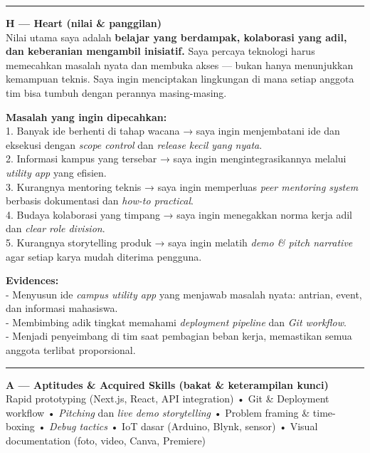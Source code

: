 \documentclass[
  letterpaper,
  DIV=11,
  numbers=noendperiod]{scrreprt}
\begin{document}
\begin{center}\rule{0.5\linewidth}{0.5pt}\end{center}

\textbf{H --- Heart (nilai \& panggilan)}\\
Nilai utama saya adalah \textbf{belajar yang berdampak, kolaborasi yang
adil, dan keberanian mengambil inisiatif.} Saya percaya teknologi harus
memecahkan masalah nyata dan membuka akses --- bukan hanya menunjukkan
kemampuan teknis. Saya ingin menciptakan lingkungan di mana setiap
anggota tim bisa tumbuh dengan perannya masing-masing.

\textbf{Masalah yang ingin dipecahkan:}\\
1. Banyak ide berhenti di tahap wacana → saya ingin menjembatani ide dan
eksekusi dengan \emph{scope control} dan \emph{release kecil yang
nyata}.\\
2. Informasi kampus yang tersebar → saya ingin mengintegrasikannya
melalui \emph{utility app} yang efisien.\\
3. Kurangnya mentoring teknis → saya ingin memperluas \emph{peer
mentoring system} berbasis dokumentasi dan \emph{how-to practical}.\\
4. Budaya kolaborasi yang timpang → saya ingin menegakkan norma kerja
adil dan \emph{clear role division}.\\
5. Kurangnya storytelling produk → saya ingin melatih \emph{demo \&
pitch narrative} agar setiap karya mudah diterima pengguna.

\textbf{Evidences:}\\
- Menyusun ide \emph{campus utility app} yang menjawab masalah nyata:
antrian, event, dan informasi mahasiswa.\\
- Membimbing adik tingkat memahami \emph{deployment pipeline} dan
\emph{Git workflow}.\\
- Menjadi penyeimbang di tim saat pembagian beban kerja, memastikan
semua anggota terlibat proporsional.

\begin{center}\rule{0.5\linewidth}{0.5pt}\end{center}

\textbf{A --- Aptitudes \& Acquired Skills (bakat \& keterampilan
kunci)}\\
Rapid prototyping (Next.js, React, API integration) • Git \& Deployment
workflow • \emph{Pitching} dan \emph{live demo storytelling} • Problem
framing \& time-boxing • \emph{Debug tactics} • IoT dasar (Arduino,
Blynk, sensor) • Visual documentation (foto, video, Canva, Premiere)
\end{document}
